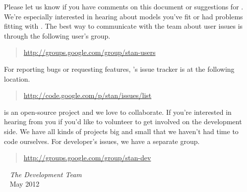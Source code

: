 Please let us know if you have comments on this document or
suggestions for \Stan.  We're especially interested in hearing about
models you've fit or had problems fitting with \Stan.  The best way to
communicate with the \Stan team about user issues is through the
following user's group.
%
\begin{quote}
\url{http://groups.google.com/group/stan-users}
\end{quote}
%
For reporting bugs or requesting features, \Stan's issue tracker is at
the following location.
%
\begin{quote}
\url{http://code.google.com/p/stan/issues/list}
\end{quote}

\Stan is an open-source project and we love to collaborate.  If you're
interested in hearing from you if you'd like to volunteer to get
involved on the development side.  We have all kinds of projects big
and small that we haven't had time to code ourselves.  For developer's
issues, we have a separate group.
%
\begin{quote}
\url{http://groups.google.com/group/stan-dev}
\end{quote}

\vspace*{12pt}
\mbox{ } \hfill {\it The \Stan Development Team}
\\
\mbox{ } \hfill {May 2012}
